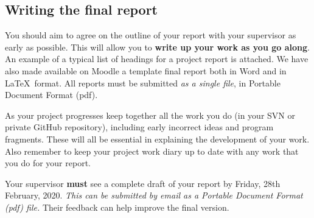 \documentclass[11pt]{article}
\newcommand{\draftSubmissionDate}{Friday, 28th February, 2020} %
\begin{document}
\subsection{Writing the final report}

You should aim to agree on the outline of your report with your supervisor as early as possible. This will allow you to {\bf write up your work as you go along}.  An example of a typical list of headings for a project report is attached.  We have also made available on Moodle a template final report both in Word and in \LaTeX\ format.  All reports must be submitted \emph{as a single file}, in Portable Document Format (pdf).

As your project progresses keep together all the work you do (in your SVN or private GitHub repository), including early incorrect ideas and program fragments. These will all be
essential in explaining the development of your work.  Also remember to keep your project work diary up to date with any work that you do for your report.

Your supervisor \textbf{must} see a complete draft of your report by \draftSubmissionDate.  \textit{This can be submitted by email as a Portable Document Format (pdf)  file.}  Their feedback can help improve the final version.
\end{document}
